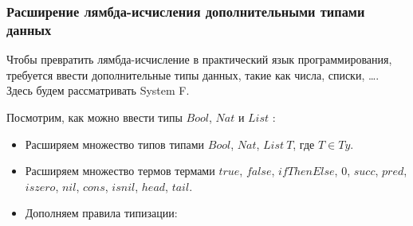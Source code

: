 \subsubsection{Расширение лямбда-исчисления дополнительными типами данных}

Чтобы превратить лямбда-исчисление в практический язык программирования,
требуется ввести дополнительные типы данных, такие как числа, списки, \dots.
Здесь будем рассматривать System F.

Посмотрим, как можно ввести типы \(Bool\), \(Nat\) и \(List\) \cite{tapl}:
\begin{itemize}
\item Расширяем множество типов типами \(Bool\), \(Nat\), \(List\ T\), где \(T \in Ty\).
\item Расширяем множество термов термами \(true\), \(false\), \(ifThenElse\),
   \(0\), \(succ\), \(pred\), \(iszero\),
   \(nil\), \(cons\), \(isnil\), \(head\), \(tail\).
\item Дополняем правила типизации:
   \begin{prooftree}
   \end{prooftree}
   \begin{prooftree}
   \end{prooftree}
   \begin{prooftree}
   \end{prooftree}

   \begin{prooftree}
   \end{prooftree}
   \begin{prooftree}
   \end{prooftree}
   \begin{prooftree}
   \end{prooftree}
   \begin{prooftree}
   \end{prooftree}


\end{itemize}
